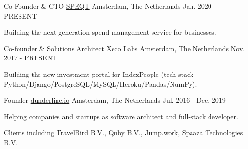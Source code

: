 

\begin{cventries}

  \cventry
    {Co-Founder \& CTO} %
    {\href{https://www.speqt.co}{SPEQT}} %
    {Amsterdam, The Netherlands} %
    {Jan. 2020 - PRESENT} %
    {
      \begin{cvitems} %
      \item {Building the next generation spend management service for businesses.}
      \end{cvitems}
	}

  \cventry
    {Co-founder \& Solutions Architect} %
    {\href{https://www.xecolabs.com}{Xeco Labs}} %
    {Amsterdam, The Netherlands} %
    {Nov. 2017 - PRESENT} %
    {
      \begin{cvitems} %
      \item {Building the new investment portal for IndexPeople (tech stack Python/Django/PostgreSQL/MySQL/Heroku/Pandas/NumPy).}
      \end{cvitems}
	}


  \cventry
    {Founder} %
    {\href{https://www.dunderline.io/}{dunderline.io}} %
    {Amsterdam, The Netherlands} %
    {Jul. 2016 - Dec. 2019} %
    {
      \begin{cvitems} %
        \item {Helping companies and startups as software architect and full-stack developer.}
        \item {Clients including TravelBird B.V., Quby B.V., Jump.work, Spaaza Technologies B.V.}
      \end{cvitems}
    }


\end{cventries}
